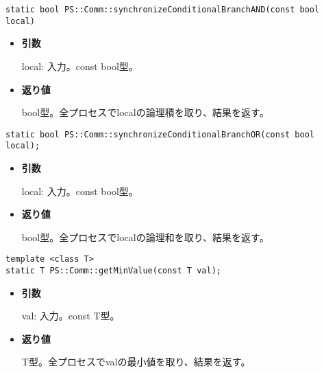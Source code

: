 \begin{screen}
\begin{verbatim}
static bool PS::Comm::synchronizeConditionalBranchAND(const bool local)
\end{verbatim}
\end{screen}

\begin{itemize}

\item{{\bf 引数}}

local: 入力。const bool型。

\item{{\bf 返り値}}

bool型。全プロセスでlocalの論理積を取り、結果を返す。

\end{itemize}


\begin{screen}
\begin{verbatim}
static bool PS::Comm::synchronizeConditionalBranchOR(const bool local);
\end{verbatim}
\end{screen}

\begin{itemize}

\item{{\bf 引数}}

local: 入力。const bool型。

\item{{\bf 返り値}}

bool型。全プロセスでlocalの論理和を取り、結果を返す。

\end{itemize}


\begin{screen}
\begin{verbatim}
template <class T>
static T PS::Comm::getMinValue(const T val);
\end{verbatim}
\end{screen}

\begin{itemize}

\item{{\bf 引数}}

val: 入力。const T型。

\item{{\bf 返り値}}

T型。全プロセスでvalの最小値を取り、結果を返す。

\end{itemize}

